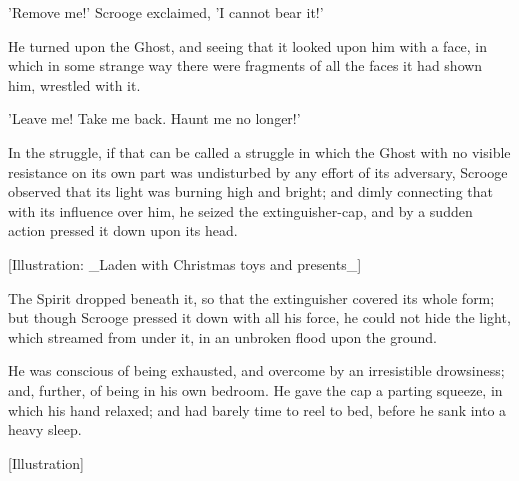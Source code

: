 'Remove me!' Scrooge exclaimed, 'I cannot bear it!'

He turned upon the Ghost, and seeing that it looked upon him with a
face, in which in some strange way there were fragments of all the faces
it had shown him, wrestled with it.

'Leave me! Take me back. Haunt me no longer!'

In the struggle, if that can be called a struggle in which the Ghost
with no visible resistance on its own part was undisturbed by any effort
of its adversary, Scrooge observed that its light was burning high and
bright; and dimly connecting that with its influence over him, he seized
the extinguisher-cap, and by a sudden action pressed it down upon its
head.

[Illustration: _Laden with Christmas toys and presents_]

The Spirit dropped beneath it, so that the extinguisher covered its
whole form; but though Scrooge pressed it down with all his force, he
could not hide the light, which streamed from under it, in an unbroken
flood upon the ground.

He was conscious of being exhausted, and overcome by an irresistible
drowsiness; and, further, of being in his own bedroom. He gave the cap a
parting squeeze, in which his hand relaxed; and had barely time to reel
to bed, before he sank into a heavy sleep.

[Illustration]

